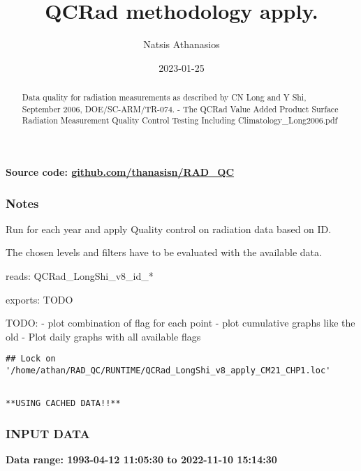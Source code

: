 \documentclass[
  10pt,
  a4paper,oneside]{article}
\title{QCRad methodology apply.}
\author{Natsis Athanasios}
\date{2023-01-25}
\begin{document}
\maketitle
\begin{abstract}
Data quality for radiation measurements as described by CN Long and Y Shi, September 2006, DOE/SC-ARM/TR-074. - The QCRad Value Added Product Surface Radiation Measurement Quality Control Testing Including Climatology\_Long2006.pdf
\end{abstract}

{
\hypersetup{linkcolor=}
\setcounter{tocdepth}{2}
\tableofcontents
}
\textbf{Source code: \href{https://github.com/thanasisn/RAD_QC}{github.com/thanasisn/RAD\_QC}}

\hypertarget{notes}{%
\subsubsection{Notes}\label{notes}}

Run for each year and apply Quality control on radiation data based on ID.

The chosen levels and filters have to be evaluated with the available data.

reads: QCRad\_LongShi\_v8\_id\_*

exports: TODO

TODO:
- plot combination of flag for each point
- plot cumulative graphs like the old
- Plot daily graphs with all available flags

\begin{verbatim}
## Lock on '/home/athan/RAD_QC/RUNTIME/QCRad_LongShi_v8_apply_CM21_CHP1.loc'
\end{verbatim}

\begin{verbatim}

**USING CACHED DATA!!**
\end{verbatim}

\hypertarget{input-data}{%
\subsubsection{INPUT DATA}\label{input-data}}

\textbf{Data range: 1993-04-12 11:05:30 to 2022-11-10 15:14:30}
\end{document}
